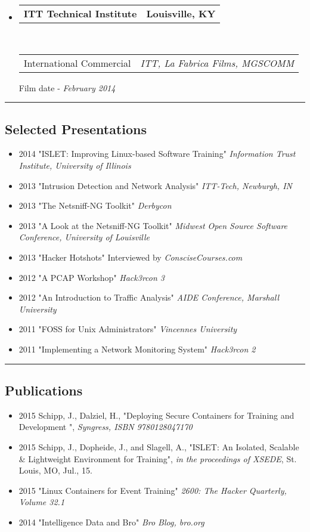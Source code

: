 \documentclass[10pt,letterpaper]{article}
\makeatletter
\newcommand{\headerrow}[2]
{\begin{tabular*}{\linewidth}{l@{\extracolsep{\fill}}r}
	#1 &
	#2 \\
\end{tabular*}}
\makeatother
\begin{document}
\begin{itemize}
	\parskip=0.1em

	\item
	\headerrow
		{\textbf{ITT Technical Institute}}
		{\textbf{Louisville, KY}}
	\\
	\headerrow
		{International Commercial}
		{\emph{ITT, La Fabrica Films, MGSCOMM}}
		{Film date - \emph{February 2014}}
\end{itemize}

\hrule
\vspace{-0.4em}
\subsection*{Selected Presentations}

\begin{itemize}
	\item \textsc{2014} "ISLET: Improving Linux-based Software Training" \textit{Information Trust Institute, University of Illinois}
	\item \textsc{2013} "Intrusion Detection and Network Analysis" \textit{ITT-Tech, Newburgh, IN}
	\item \textsc{2013} "The Netsniff-NG Toolkit" \textit{Derbycon}
	\item \textsc{2013} "A Look at the Netsniff-NG Toolkit" \textit{Midwest Open Source Software Conference, University of Louisville}
	\item \textsc{2013} "Hacker Hotshots" Interviewed by \textit{ConsciseCourses.com}
	\item \textsc{2012} "A PCAP Workshop" \textit{Hack3rcon 3}
	\item \textsc{2012} "An Introduction to Traffic Analysis" \textit{AIDE Conference, Marshall University}
	\item \textsc{2011} "FOSS for Unix Administrators" \textit{Vincennes University}
	\item \textsc{2011} "Implementing a Network Monitoring System" \textit{Hack3rcon 2}
\end{itemize}

\hrule
\vspace{-0.4em}
\subsection*{Publications}
\begin{itemize}
	\parskip=0.1em
        \item \textsc{2015} Schipp, J., Dalziel, H., "Deploying Secure Containers for Training and Development ",
        \textit{Syngress, ISBN 9780128047170}
        \item \textsc{2015} Schipp, J., Dopheide, J., and Slagell, A., "ISLET: An Isolated, Scalable
        \& Lightweight Environment for Training", \textit{in the proceedings of
        XSEDE}, St. Louis, MO, Jul., 15.
	\item \textsc{2015} "Linux Containers for Event Training" \textit{2600:
          The Hacker Quarterly, Volume 32.1}
	\item \textsc{2014} "Intelligence Data and Bro" \textit{Bro Blog, bro.org}
\end{itemize}
\end{document}
